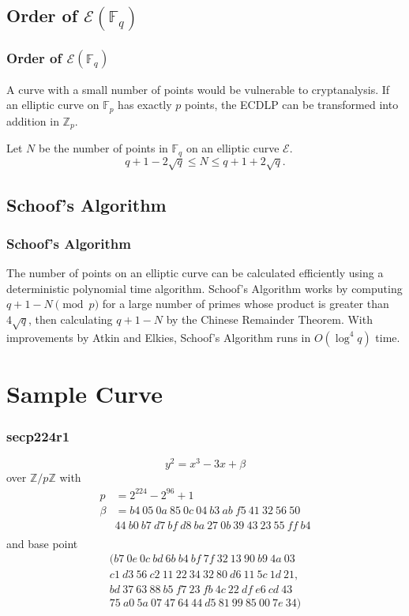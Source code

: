 \documentclass{beamer}
\newcommand{\zmod}[1]{\ensuremath{\mathbb{Z}/#1\mathbb{Z}}}
\begin{document}
    \subsection{Order of \(\mathcal{E}(\mathbb{F}_q)\)}
    \begin{frame}
        \frametitle{Order of \(\mathcal{E}(\mathbb{F}_q)\)}
        A curve with a small number of points would be vulnerable to
        cryptanalysis.
        \vfill
        If an elliptic curve on \(\mathbb{F}_p\) has exactly \(p\) points,
        the ECDLP can be transformed into addition in \(\mathbb{Z}_p\).
        \vfill
        \begin{definition}
            Let \(N\) be the number of points in \(\mathbb{F}_q\)
            on an elliptic curve \(\mathcal{E}\).
            \[q + 1 - 2\sqrt{q} \leq N \leq q + 1 + 2\sqrt{q}.\]
        \end{definition}
    \end{frame}
    
    \subsection{Schoof's Algorithm}
    \begin{frame}
        \frametitle{Schoof's Algorithm}
        The number of points on an elliptic curve can be calculated
        efficiently using a deterministic polynomial time algorithm.
        \vfill
        Schoof's Algorithm works by computing \(q + 1 - N \pmod p\) for
        a large number of primes whose product is greater than \(4\sqrt{q}\),
        then calculating \(q + 1 - N\) by the Chinese Remainder Theorem.
        \vfill
        With improvements by Atkin and Elkies, Schoof's Algorithm
        runs in \(O(\log^4 q)\) time.
    \end{frame}

    \section{Sample Curve}
    \begin{frame}
        \frametitle{secp224r1}
        \[y^2 = x^3 -3x + \beta\]
        over \zmod{p} with
        \begin{align*}
        p &= 2^224 - 2^96 + 1 \\
        \beta &= b4~05~0a~85~0c~04~b3~ab~f5~41~32~56~50 \\
        & 44~b0~b7~d7~bf~d8~ba~27~0b~39~43~23~55~ff~b4 \\
        \end{align*}
        and base point
        \begin{align*}
        (b7~0e~0c~bd~6b~b4~bf~7f~32~13~90~b9~4a~03 \\
        c1~d3~56~c2~11~22~34~32~80~d6~11~5c~1d~21, \\
        bd~37~63~88~b5~f7~23~fb~4c~22~df~e6~cd~43 \\
        75~a0~5a~07~47~64~44~d5~81~99~85~00~7e~34) \\
        \end{align*}
    \end{frame}
\end{document}
